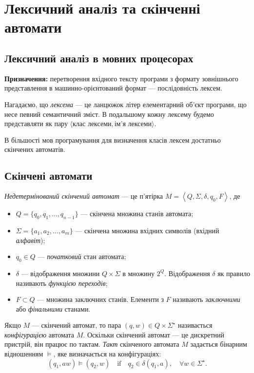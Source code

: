 \setcounter{section}{1}

\section{Лексичний аналіз та скінченні автомати}

\subsection{Лексичний аналіз в мовних процесорах}

\textbf{Призначення:} перетворення вхідного тексту програми з формату зовнішнього представлення в машинно-орієнтований формат --- послідовність лексем. \medskip

Нагадаємо, що \textit{лексема} --- це ланцюжок літер елементарний об'єкт програми, що несе певний семантичний зміст. В подальшому кожну лексему будемо представляти як пару $\langle\text{клас лексеми}, \text{ім'я лексеми}\rangle$. \medskip

В більшості мов програмування для визначення класів лексем достатньо скінчених автоматів.

\subsection{Скінчені автомати}

\textit{Недетермінований скінчений автомат} --- це п'ятірка $M = \left\langle Q, \Sigma, \delta, q_0, F \right\rangle$, де
\begin{itemize}
	\item $Q = \{q_0, q_1, \ldots, q_{n-1}\}$ --- скінчена множина станів автомата;
	\item $\Sigma = \{a_1, a_2, \ldots, a_m\}$ --- скінчена множина вхідних символів (вхідний \textit{алфавіт});
	\item $q_0 \in Q$ --- \textit{початковий} стан автомата;
	\item $\delta$ --- відображення множини $Q \times \Sigma$ в множину $2^Q$. Відображення $\delta$ як правило називають \textit{функцією переходів};
	\item $F \subset Q$ --- множина заключних станів. Елементи з $F$ називають \textit{заключними} або \textit{фінальними} станами.
\end{itemize}

Якщо $M$ --- скінчений автомат, то пара $(q, w) \in Q \times \Sigma^\star$ називається \textit{конфігурацією} автомата $M$. Оскільки скінчений автомат --- це дискретний пристрій, він працює по тактам. \textit{Такт} скінченого автомата $M$ задається бінарним відношенням $\models$, яке визначається на конфігураціях:
\begin{equation}
	(q_1, a w) \models (q_2, w) \quad \text{if} \quad q_2 \in \delta(q_1, a), \quad \forall w \in \Sigma^\star.
\end{equation}

